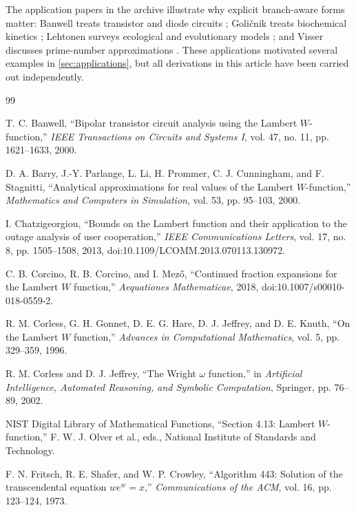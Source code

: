 \documentclass[11pt]{article}
\numberwithin{equation}{section}
\theoremstyle{definition}
\theoremstyle{remark}
\begin{document}
The application papers in the archive illustrate why explicit branch-aware
forms matter: Banwell treats transistor and diode circuits
\cite{Banwell2000}; Goli\v{c}nik treats biochemical kinetics
\cite{Golicnik2012}; Lehtonen surveys ecological and evolutionary models
\cite{Lehtonen2016}; and Visser discusses prime-number approximations
\cite{Visser2018}.  These applications motivated several examples in
\cref{sec:applications}, but all derivations in this article have been carried
out independently.

\begin{thebibliography}{99}

T. C. Banwell,
``Bipolar transistor circuit analysis using the Lambert $W$-function,''
\emph{IEEE Transactions on Circuits and Systems I}, vol. 47, no. 11,
pp. 1621--1633, 2000.

D. A. Barry, J.-Y. Parlange, L. Li, H. Prommer, C. J. Cunningham, and
F. Stagnitti,
``Analytical approximations for real values of the Lambert $W$-function,''
\emph{Mathematics and Computers in Simulation}, vol. 53, pp. 95--103, 2000.

I. Chatzigeorgiou,
``Bounds on the Lambert function and their application to the outage analysis
of user cooperation,''
\emph{IEEE Communications Letters}, vol. 17, no. 8, pp. 1505--1508, 2013,
doi:10.1109/LCOMM.2013.070113.130972.

C. B. Corcino, R. B. Corcino, and I. Mez\H{o},
``Continued fraction expansions for the Lambert $W$ function,''
\emph{Aequationes Mathematicae}, 2018,
doi:10.1007/s00010-018-0559-2.

R. M. Corless, G. H. Gonnet, D. E. G. Hare, D. J. Jeffrey, and D. E. Knuth,
``On the Lambert $W$ function,''
\emph{Advances in Computational Mathematics}, vol. 5, pp. 329--359, 1996.

R. M. Corless and D. J. Jeffrey,
``The Wright $\omega$ function,'' in
\emph{Artificial Intelligence, Automated Reasoning, and Symbolic Computation},
Springer, pp. 76--89, 2002.

NIST Digital Library of Mathematical Functions,
``Section 4.13: Lambert $W$-function,''
F. W. J. Olver et al., eds., National Institute of Standards and Technology.

F. N. Fritsch, R. E. Shafer, and W. P. Crowley,
``Algorithm 443: Solution of the transcendental equation $we^w=x$,''
\emph{Communications of the ACM}, vol. 16, pp. 123--124, 1973.


\end{thebibliography}
\end{document}
